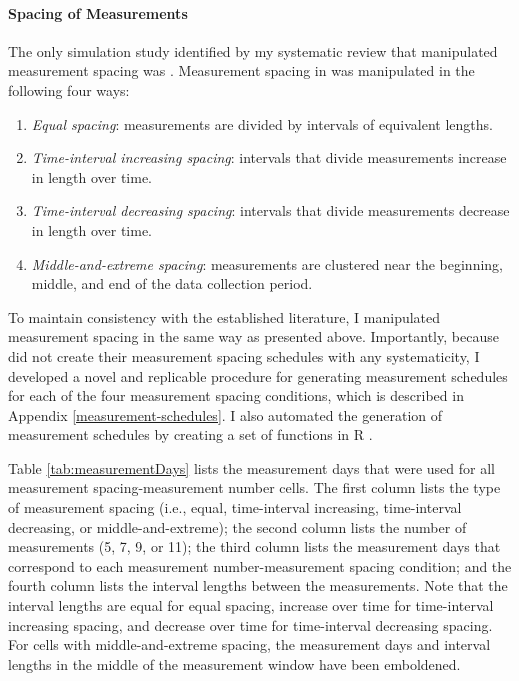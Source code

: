 \documentclass[
12pt, %
twoside,
english]{guelphthesis}
\begin{document}
\hypertarget{spacing-measurements}{%
\paragraph{Spacing of Measurements}\label{spacing-measurements}}

The only simulation study identified by my systematic review that manipulated measurement spacing was \textcite{timmons2015}. Measurement spacing in \textcite{timmons2015} was manipulated in the following four ways:
\begin{enumerate}
\def\labelenumi{\arabic{enumi})}
\item
  \emph{Equal spacing}: measurements are divided by intervals of equivalent lengths.
\item
  \emph{Time-interval increasing spacing}: intervals that divide measurements increase in length over time.
\item
  \emph{Time-interval decreasing spacing}: intervals that divide measurements decrease in length over time.
\item
  \emph{Middle-and-extreme spacing}: measurements are clustered near the beginning, middle, and end of the data collection period.
\end{enumerate}
\noindent To maintain consistency with the established literature, I manipulated measurement spacing in the same way as \textcite{timmons2015} presented above. Importantly, because \textcite{timmons2015} did not create their measurement spacing schedules with any systematicity, I developed a novel and replicable procedure for generating measurement schedules for each of the four measurement spacing conditions, which is described in Appendix \ref{measurement-schedules}. I also automated the generation of measurement schedules by creating a set of functions in R \autocite{rstudio}.

Table \ref{tab:measurementDays} lists the measurement days that were used for all measurement spacing-measurement number cells. The first column lists the type of measurement spacing (i.e., equal, time-interval increasing, time-interval decreasing, or middle-and-extreme); the second column lists the number of measurements (5, 7, 9, or 11); the third column lists the measurement days that correspond to each measurement number-measurement spacing condition; and the fourth column lists the interval lengths between the measurements. Note that the interval lengths are equal for equal spacing, increase over time for time-interval increasing spacing, and decrease over time for time-interval decreasing spacing. For cells with middle-and-extreme spacing, the measurement days and interval lengths in the middle of the measurement window have been emboldened.
\end{document}
